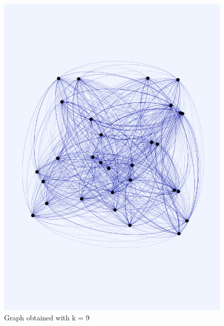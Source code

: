 \documentclass[11pt]{article}
\begin{document}
\begin{figure}
\includegraphics[scale=0.2]{Graph_K9}
\caption{Graph obtained with k = 9}
\end{figure}
\end{document}

